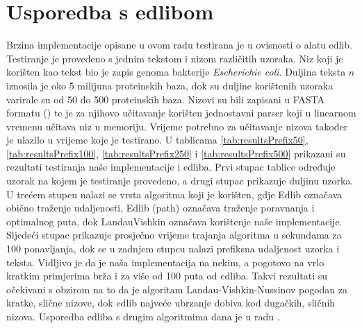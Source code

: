 \documentclass[times, utf8, zavrsni]{fer}
\begin{document}
\section{Usporedba s edlibom}
Brzina implementacije opisane u ovom radu testirana je u ovisnosti o alatu edlib. Testiranje je provedeno s jednim tekstom i nizom različitih uzoraka. Niz koji je korišten kao tekst bio je zapis genoma bakterije \textit{Escherichie coli}. Duljina teksta $n$ iznosila je oko 5 milijuna proteinskih baza, dok su duljine korištenih uzoraka varirale su od 50 do 500 proteinskih baza. Nizovi su bili zapisani u FASTA formatu (\cite{FASTA}) te je za njihovo učitavanje korišten jednostavni parser koji u linearnom vremenu učitava niz u memoriju. Vrijeme potrebno za učitavanje nizova također je ulazilo u vrijeme koje je testirano. U tablicama \ref{tab:resultsPrefix50}, \ref{tab:resultsPrefix100}, \ref{tab:resultsPrefix250} i \ref{tab:resultsPrefix500} prikazani su rezultati testiranja naše implementacije i edliba. Prvi stupac tablice određuje uzorak na kojem je testiranje provedeno, a drugi stupac prikazuje duljinu uzorka. U trećem stupcu nalazi se vrsta algoritma koji je korišten, gdje Edlib označava obično traženje udaljenosti, Edlib (path) označava traženje poravnanja i optimalnog puta, dok LandauVishkin označava korištenje naše implementacije. Sljedeći stupac prikazuje prosječno vrijeme trajanja algoritma u sekundama za 100 ponavljanja, dok se u zadnjem stupcu nalazi prefiksna udaljenost uzorka i teksta. Vidljivo je da je naša implementacija na nekim, a pogotovo na vrlo kratkim primjerima brža i za više od 100 puta od edliba. Takvi rezultati su očekivani s obzirom na to da je algoritam Landau-Vishkin-Nussinov pogodan za kratke, slične nizove, dok edlib najveće ubrzanje dobiva kod dugačkih, sličnih nizova. Usporedba edliba s drugim algoritmima dana je u radu \cite{edlib}.
\end{document}
